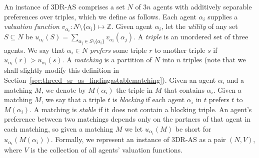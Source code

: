 An instance of 3DR-AS comprises a set $N$ of $3n$ agents with additively separable preferences over triples, which we define as follows. Each agent $\alpha_i$ supplies a \textit{valuation function} $v_{\alpha_i} : N\setminus \{ {\alpha_i} \} \mapsto \mathbb{Z}$. Given agent $\alpha_i$, let the \emph{utility} of any set $S\subseteq N$ be $u_{\alpha_i}(S) = \sum_{{\alpha_j}\in S \setminus \{ \alpha_i \}} v_{\alpha_i}({\alpha_j})$. A \emph{triple} is an unordered set of three agents. We say that $\alpha_i \in N$ \emph{prefers} some triple $r$ to another triple $s$ if $u_{\alpha_i}(r) > u_{\alpha_i}(s)$. A \emph{matching} is a partition of $N$ into $n$ triples (note that we shall slightly modify this definition in Section~\ref{sec:threed_sr_as_findingastablematching}). Given an agent $\alpha_i$ and a matching $M$, we denote by $M(\alpha_i)$ the triple in $M$ that contains $\alpha_i$. Given a matching $M$, we say that a triple $t$ is \emph{blocking} if each agent $\alpha_i$ in $t$ prefers $t$ to $M(\alpha_i)$. A matching is \emph{stable} if it does not contain a blocking triple. An agent's preference between two matchings depends only on the partners of that agent in each matching, so given a matching $M$ we let $u_{\alpha_i}(M)$ be short for $u_{\alpha_i}(M(\alpha_i))$. Formally, we represent an instance of 3DR-AS as a pair $(N, V)$, where $V$ is the collection of all agents' valuation functions.




